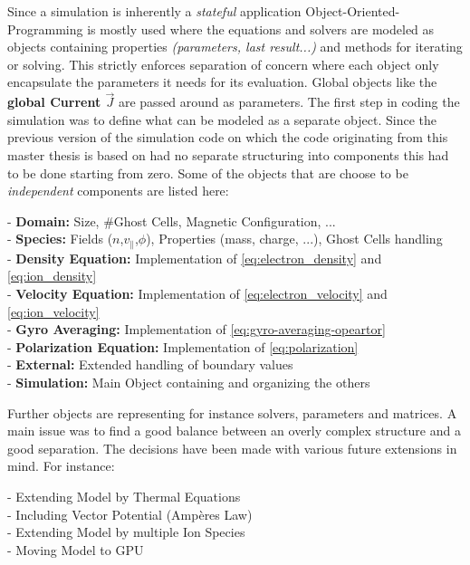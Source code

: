 \documentclass[master.tex]{subfiles}
\begin{document}
Since a simulation is inherently a \textit{stateful} application Object-Oriented-Programming is mostly used where the equations and solvers are modeled as objects containing properties \textit{(parameters, last result...)} and methods for iterating or solving. This strictly enforces separation of concern where each object only encapsulate the parameters it needs for its evaluation. Global objects like the \textbf{global Current $\vec{J}$} are passed around as parameters.\newline
The first step in coding the simulation was to define what can be modeled as a separate object. Since the previous version of the simulation code on which the code originating from this master thesis is based on  had no separate structuring into components this had to be done starting from zero.\newline
Some of the objects that are choose to be \textit{independent} components are listed here:
\begin{blockquote}
  
- \textbf{Domain:} Size, \#Ghost Cells, Magnetic Configuration, ...\\
- \textbf{Species:} Fields ($n$,$v_\parallel$,$\phi$), Properties (mass, charge, ...), Ghost Cells handling\\
- \textbf{Density Equation:} Implementation of \autoref{eq:electron_density} and \autoref{eq:ion_density}\\
- \textbf{Velocity Equation:} Implementation of \autoref{eq:electron_velocity} and \autoref{eq:ion_velocity}\\
- \textbf{Gyro Averaging:} Implementation of \autoref{eq:gyro-averaging-opeartor}\\
- \textbf{Polarization Equation:} Implementation of \autoref{eq:polarization}\\
- \textbf{External:} Extended handling of boundary values\\
- \textbf{Simulation:} Main Object containing and organizing the others
\end{blockquote}
Further objects are representing for instance solvers, parameters and matrices.\newline
A main issue was to find a good balance between an overly complex structure and a good separation. The decisions have been made with various future extensions in mind. For instance:
\begin{blockquote}
  - Extending Model by Thermal Equations\\
  - Including Vector Potential (Ampères Law)\\
  - Extending Model by multiple Ion Species\\
  - Moving Model to GPU
\end{blockquote}
\end{document}
